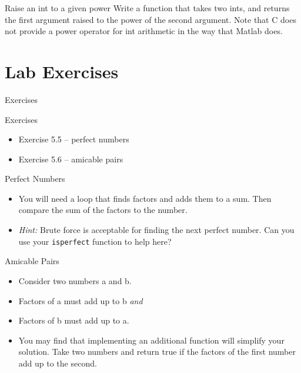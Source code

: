 \documentclass{beamer}
\begin{document}
\begin{frame}{Raise an int to a given power}
    Write a function that takes two ints, and returns the first argument
    raised to the power of the second argument. Note that C does not
    provide a power operator for int arithmetic in the way that Matlab does.
\end{frame}

\section{Lab Exercises}

\begin{frame}{Exercises}
    \begin{block}{Exercises}
        \begin{itemize}
            \item Exercise 5.5 -- perfect numbers
            \item Exercise 5.6 -- amicable pairs
        \end{itemize}
    \end{block}
\end{frame}

\begin{frame}{Perfect Numbers}
    \begin{itemize}
        \item You will need a loop that finds factors and adds them to a
            sum. Then compare the sum of the factors to the number.
        \item \emph{Hint:} Brute force is acceptable for finding the next
            perfect number. Can you use your \texttt{isperfect} function to
            help here?
    \end{itemize}
\end{frame}

\begin{frame}{Amicable Pairs}
    \begin{itemize}
        \item Consider two numbers a and b.
        \item Factors of a must add up to b \emph{and}
        \item Factors of b must add up to a.
        \item You may find that implementing an additional function will
            simplify your solution. Take two numbers and return true if the
            factors of the first number add up to the second.
    \end{itemize}
\end{frame}
\end{document}
